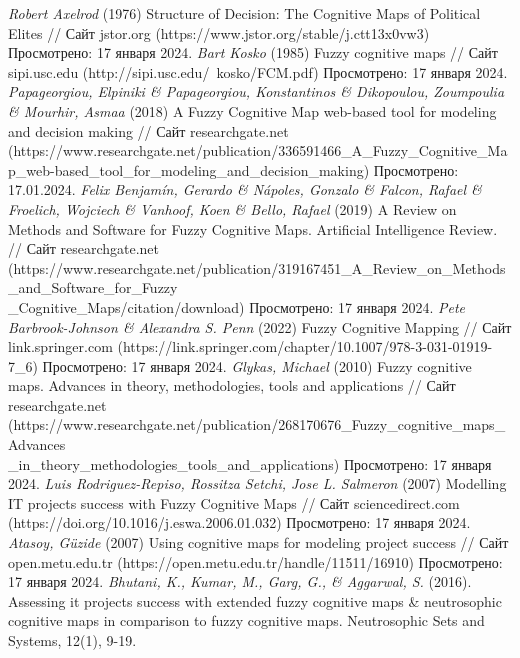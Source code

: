 \documentclass{article}
\begin{document}
\begin{itemize}
\begin{thebibliography}{}
         \textit{Robert Axelrod} (1976) Structure of Decision: The Cognitive Maps of Political Elites // Сайт jstor.org (https://www.jstor.org/stable/j.ctt13x0vw3) Просмотрено: 17 января 2024.
         \textit{Bart Kosko} (1985) Fuzzy cognitive maps // Сайт sipi.usc.edu (http://sipi.usc.edu/~kosko/FCM.pdf) Просмотрено: 17 января 2024.
         \textit{Papageorgiou, Elpiniki \& Papageorgiou, Konstantinos \& Dikopoulou, Zoumpoulia \& Mourhir, Asmaa} (2018) A Fuzzy Cognitive Map web-based tool for modeling and decision making // Сайт researchgate.net (https://www.researchgate.net/publication/336591466\_A\_Fuzzy\_Cognitive\_Map\_web-based\_tool\_for\_modeling\_and\_decision\_making) Просмотрено: 17.01.2024.
         \textit{Felix Benjamín, Gerardo \& Nápoles, Gonzalo \& Falcon, Rafael \& Froelich, Wojciech \& Vanhoof, Koen \& Bello, Rafael} (2019) A Review on Methods and Software for Fuzzy Cognitive Maps. Artificial Intelligence Review. // Сайт researchgate.net (https://www.researchgate.net/publication/319167451\_A\_Review\_on\_Methods\_and\_Software\_for\_Fuzzy\\\_Cognitive\_Maps/citation/download) Просмотрено: 17 января 2024.
         \textit{Pete Barbrook-Johnson \& Alexandra S. Penn} (2022) Fuzzy Cognitive Mapping // Сайт link.springer.com (https://link.springer.com/chapter/10.1007/978-3-031-01919-7\_6) Просмотрено: 17 января 2024.
         \textit{Glykas, Michael} (2010) Fuzzy cognitive maps. Advances in theory, methodologies, tools and applications // Сайт researchgate.net (https://www.researchgate.net/publication/268170676\_Fuzzy\_cognitive\_maps\_Advances\\\_in\_theory\_methodologies\_tools\_and\_applications) Просмотрено: 17 января 2024.
         \textit{Luis Rodriguez-Repiso, Rossitza Setchi, Jose L. Salmeron} (2007) Modelling IT projects success with Fuzzy Cognitive Maps // Сайт sciencedirect.com (https://doi.org/10.1016/j.eswa.2006.01.032) Просмотрено: 17 января 2024.
         \textit{Atasoy, Güzide} (2007) Using cognitive maps for modeling project success // Сайт open.metu.edu.tr (https://open.metu.edu.tr/handle/11511/16910) Просмотрено: 17 января 2024.
         \textit{Bhutani, K., Kumar, M., Garg, G., \& Aggarwal, S.} (2016). Assessing it projects success with extended fuzzy cognitive maps \& neutrosophic cognitive maps in comparison to fuzzy cognitive maps. Neutrosophic Sets and Systems, 12(1), 9-19.

\end{thebibliography}
\end{itemize}
\end{document}
